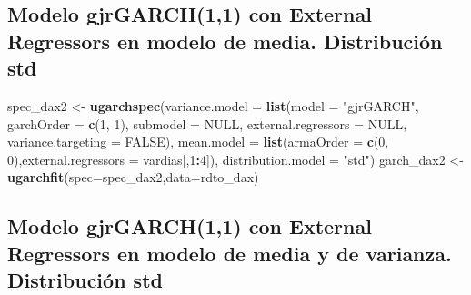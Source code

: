 \documentclass[
  11pt,
]{article}
\newenvironment{Shaded}{\begin{snugshade}}{\end{snugshade}}
\newcommand{\DataTypeTok}[1]{\textcolor[rgb]{0.13,0.29,0.53}{#1}}
\newcommand{\DecValTok}[1]{\textcolor[rgb]{0.00,0.00,0.81}{#1}}
\newcommand{\KeywordTok}[1]{\textcolor[rgb]{0.13,0.29,0.53}{\textbf{#1}}}
\newcommand{\NormalTok}[1]{#1}
\newcommand{\OperatorTok}[1]{\textcolor[rgb]{0.81,0.36,0.00}{\textbf{#1}}}
\newcommand{\OtherTok}[1]{\textcolor[rgb]{0.56,0.35,0.01}{#1}}
\newcommand{\StringTok}[1]{\textcolor[rgb]{0.31,0.60,0.02}{#1}}
\begin{document}
\hypertarget{modelo-gjrgarch11-con-external-regressors-en-modelo-de-media.-distribuciuxf3n-std}{%
\subsection{Modelo gjrGARCH(1,1) con External Regressors en modelo de
media. Distribución
std}\label{modelo-gjrgarch11-con-external-regressors-en-modelo-de-media.-distribuciuxf3n-std}}

\begin{Shaded}
\begin{Highlighting}[]
\NormalTok{spec_dax2 <-}\StringTok{ }\KeywordTok{ugarchspec}\NormalTok{(}\DataTypeTok{variance.model =} \KeywordTok{list}\NormalTok{(}\DataTypeTok{model =} \StringTok{"gjrGARCH"}\NormalTok{, }\DataTypeTok{garchOrder =} \KeywordTok{c}\NormalTok{(}\DecValTok{1}\NormalTok{, }\DecValTok{1}\NormalTok{), }
                    \DataTypeTok{submodel =} \OtherTok{NULL}\NormalTok{, }\DataTypeTok{external.regressors =} \OtherTok{NULL}\NormalTok{, }\DataTypeTok{variance.targeting =} \OtherTok{FALSE}\NormalTok{), }
                    \DataTypeTok{mean.model =} \KeywordTok{list}\NormalTok{(}\DataTypeTok{armaOrder =} \KeywordTok{c}\NormalTok{(}\DecValTok{0}\NormalTok{, }\DecValTok{0}\NormalTok{),}\DataTypeTok{external.regressors =}\NormalTok{ vardias[,}\DecValTok{1}\OperatorTok{:}\DecValTok{4}\NormalTok{]),}
               \DataTypeTok{distribution.model =} \StringTok{"std"}\NormalTok{)}
\NormalTok{garch_dax2 <-}\StringTok{ }\KeywordTok{ugarchfit}\NormalTok{(}\DataTypeTok{spec=}\NormalTok{spec_dax2,}\DataTypeTok{data=}\NormalTok{rdto_dax)}
\end{Highlighting}
\end{Shaded}

\hypertarget{modelo-gjrgarch11-con-external-regressors-en-modelo-de-media-y-de-varianza.-distribuciuxf3n-std}{%
\subsection{Modelo gjrGARCH(1,1) con External Regressors en modelo de
media y de varianza. Distribución
std}\label{modelo-gjrgarch11-con-external-regressors-en-modelo-de-media-y-de-varianza.-distribuciuxf3n-std}}
\end{document}
